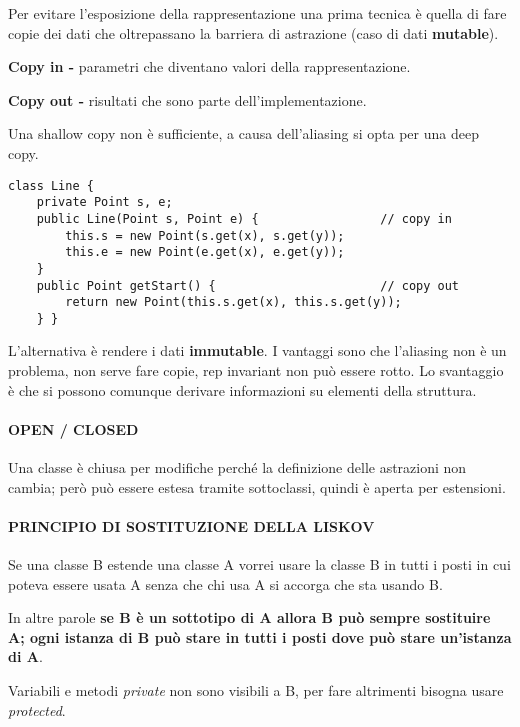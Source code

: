 \documentclass[a4paper, 12pt]{article}
\begin{document}
Per evitare l'esposizione della rappresentazione una prima tecnica è quella di fare copie
dei dati che oltrepassano la barriera di astrazione (caso di dati \textbf{mutable}).

\textbf{Copy in -} parametri che diventano valori della rappresentazione.

\textbf{Copy out -} risultati che sono parte dell'implementazione.

Una shallow copy non è sufficiente, a causa dell'aliasing si opta per una deep copy.
\begin{lstlisting}
class Line {
    private Point s, e;
    public Line(Point s, Point e) {                 // copy in
        this.s = new Point(s.get(x), s.get(y));
        this.e = new Point(e.get(x), e.get(y));
    }
    public Point getStart() {                       // copy out
        return new Point(this.s.get(x), this.s.get(y));
    } }
\end{lstlisting}
L'alternativa è rendere i dati \textbf{immutable}. I vantaggi sono che l'aliasing non è
un problema, non serve fare copie, rep invariant non può essere rotto. Lo svantaggio è
che si possono comunque derivare informazioni su elementi della struttura.

\paragraph{OPEN / CLOSED}
Una classe è chiusa per modifiche perché la definizione delle astrazioni non cambia; però
può essere estesa tramite sottoclassi, quindi è aperta per estensioni.

\paragraph{PRINCIPIO DI SOSTITUZIONE DELLA LISKOV}
Se una classe B estende una classe A vorrei usare la classe B in tutti i posti in cui
poteva essere usata A senza che chi usa A si accorga che sta usando B.

In altre parole \textbf{se B è un sottotipo di A allora B può sempre sostituire A; ogni
istanza di B può stare in tutti i posti dove può stare un'istanza di A}.

\noindent Variabili e metodi \textit{private} non sono visibili a B, per fare altrimenti
bisogna usare \textit{protected}.
\end{document}
